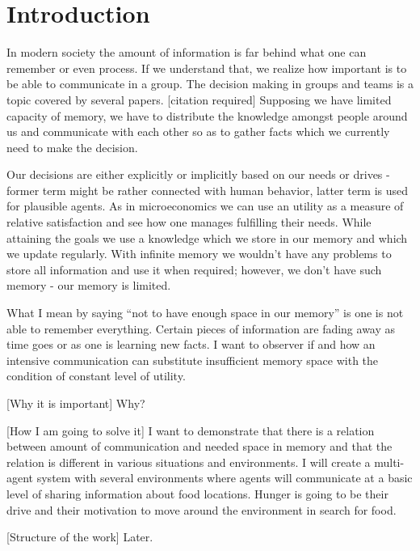 \chapter{Introduction}

In modern society the amount of information is far behind what one can remember or even process. If we understand that, we realize how important is to be able to communicate in a group. The decision making in groups and teams is a topic covered by several papers. [citation required] Supposing we have limited capacity of memory, we have to distribute the knowledge amongst people around us and communicate with each other so as to gather facts which we currently need to make the decision. 

Our decisions are either explicitly or implicitly based on our needs or drives - former term might be rather connected with human behavior, latter term is used for plausible agents. As in microeconomics we can use an utility as a measure of relative satisfaction \cite{Varian:micro} and see how one manages fulfilling their needs. While attaining the goals we use a knowledge which we store in our memory and which we update regularly. With infinite memory we wouldn’t have any problems to store all information and use it when required; however, we don’t have such memory - our memory is limited. 

What I mean by saying “not to have enough space in our memory” is one is not able to remember everything. Certain pieces of information are fading away as time goes or as one is learning new facts. I want to observer if and how an intensive communication can substitute insufficient memory space with the condition of constant level of utility.

[Why it is important]
Why?

[How I am going to solve it]
I want to demonstrate that there is a relation between amount of communication and needed space in memory and that the relation is different in various situations and environments. I will  
create a multi-agent system with several environments where agents will communicate at a basic level of sharing information about food locations. Hunger is going to be their drive and their motivation to move around the environment in search for food.

[Structure of the work]
Later.